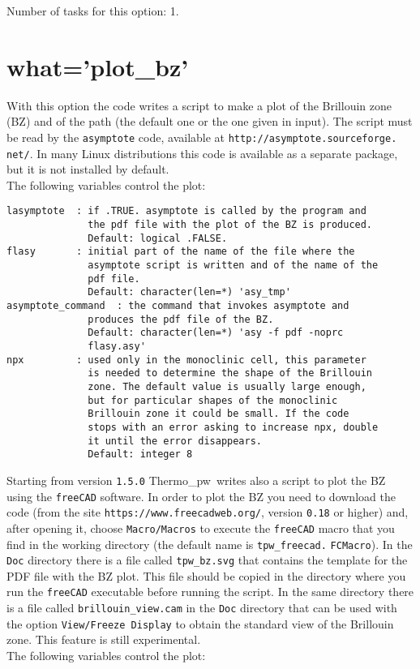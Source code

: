 \documentclass[12pt,a4paper,twoside]{report}
\def\thermo{{\sc Thermo}\_{\sc pw}}
\begin{document}
Number of tasks for this option: 1.

\newpage
{\color{coral}\section{what='plot\_bz'}}
\color{black}
With this option the code writes a script to make a plot
of the Brillouin zone (BZ) and of the path (the default one or the 
one given in input). 
The script must be read by the \texttt{asymptote} code, available at 
\texttt{http://asymptote.sourceforge.} \texttt{net/}. In many Linux 
distributions
this code is available as a separate package, but it is not installed by
default. \\
The following variables control the plot:

\begin{verbatim}
lasymptote  : if .TRUE. asymptote is called by the program and 
              the pdf file with the plot of the BZ is produced.
              Default: logical .FALSE.
flasy       : initial part of the name of the file where the 
              asymptote script is written and of the name of the 
              pdf file.
              Default: character(len=*) 'asy_tmp'
asymptote_command  : the command that invokes asymptote and 
              produces the pdf file of the BZ.
              Default: character(len=*) 'asy -f pdf -noprc 
              flasy.asy'
npx         : used only in the monoclinic cell, this parameter 
              is needed to determine the shape of the Brillouin 
              zone. The default value is usually large enough, 
              but for particular shapes of the monoclinic 
              Brillouin zone it could be small. If the code 
              stops with an error asking to increase npx, double 
              it until the error disappears.
              Default: integer 8
\end{verbatim}


Starting from version \texttt{1.5.0} \thermo\ writes also a script to
plot the BZ using the \texttt{freeCAD} software. In order to plot
the BZ you need to download the code (from the site
\texttt{https://www.freecadweb.org/}, version \texttt{0.18} or higher)
and, after opening it, choose 
\texttt{Macro/Macros} to execute the \texttt{freeCAD} macro
that you find in the working directory (the default name is 
\texttt{tpw\_freecad.} \texttt{FCMacro}). 
In the \texttt{Doc} directory there is a file called \texttt{tpw\_bz.svg} 
that contains the template for the PDF file with the BZ plot. This file
should be copied in the directory where you run the \texttt{freeCAD} 
executable before running the script.
In the same directory there is a file called \texttt{brillouin\_view.cam} 
in the \texttt{Doc} directory that can be used with the option 
\texttt{View/Freeze Display} to obtain the standard view of the Brillouin zone.
This feature is still experimental.\\
The following variables control the plot:
\end{document}
